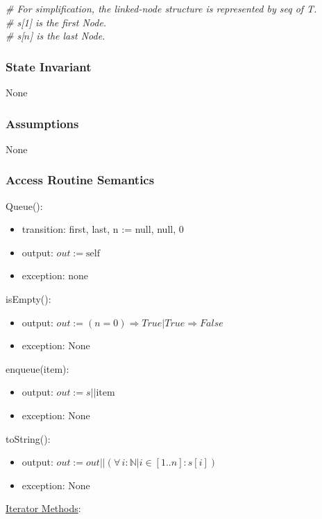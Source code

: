 \documentclass[12pt]{article}
\begin{document}
\noindent \textit{\# For simplification, the linked-node structure is represented by seq of T.}\\
\noindent \textit{\# s[1] is the first Node.}\\
\noindent \textit{\# s[$n$] is the last Node.}

\subsubsection* {State Invariant}

None

\subsubsection* {Assumptions}

None

\subsubsection* {Access Routine Semantics}

\noindent Queue():
\begin{itemize}
\item transition: first, last, n := null, null, 0
\item output: $out := \mbox{self}$
\item exception: none
\end{itemize}

\noindent isEmpty():
\begin{itemize}
\item output: $out := (n = 0) \Rightarrow True | True \Rightarrow False$
\item exception: None
\end{itemize}

\noindent enqueue(item):
\begin{itemize}
\item output: $out := s || \mbox{item}$
\item exception: None
\end{itemize}

\noindent toString():
\begin{itemize}
\item output: $out := out || (\forall\, i: \mathbb{N}| i\in[1..n] : s[i])$
\item exception: None
\end{itemize}

\medskip

\noindent \underline{Iterator Methods}:\\
\end{document}
